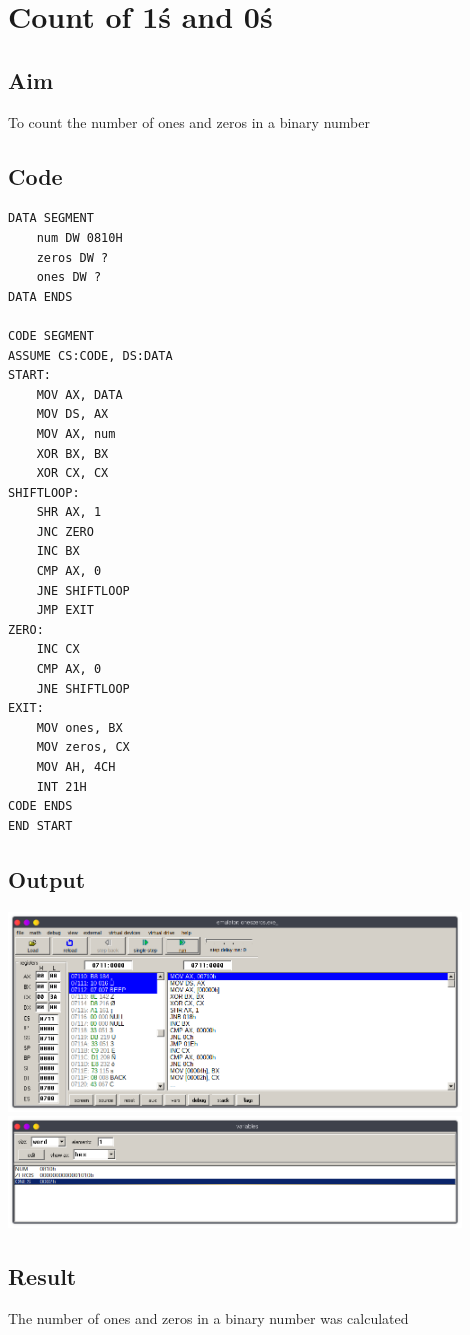 \section{Count of 1\'s and 0\'s}
\subsection{Aim}
To count the number of ones and zeros in a binary number

\subsection{Code}
\begin{lstlisting}
DATA SEGMENT
    num DW 0810H
    zeros DW ?
    ones DW ? 
DATA ENDS

CODE SEGMENT
ASSUME CS:CODE, DS:DATA  
START:
    MOV AX, DATA
    MOV DS, AX
    MOV AX, num 
    XOR BX, BX
    XOR CX, CX
SHIFTLOOP:
    SHR AX, 1
    JNC ZERO
    INC BX
    CMP AX, 0
    JNE SHIFTLOOP
    JMP EXIT
ZERO:
    INC CX
    CMP AX, 0
    JNE SHIFTLOOP 
EXIT:
    MOV ones, BX
    MOV zeros, CX
    MOV AH, 4CH
    INT 21H
CODE ENDS
END START
\end{lstlisting}

\subsection{Output}
\begin{center}
	\includegraphics[width=0.90\textwidth]{img/p15/ss1.png}
	\includegraphics[width=0.90\textwidth]{img/p15/ss2.png}
\end{center}

\subsection{Result}
The number of ones and zeros in a binary number was calculated


